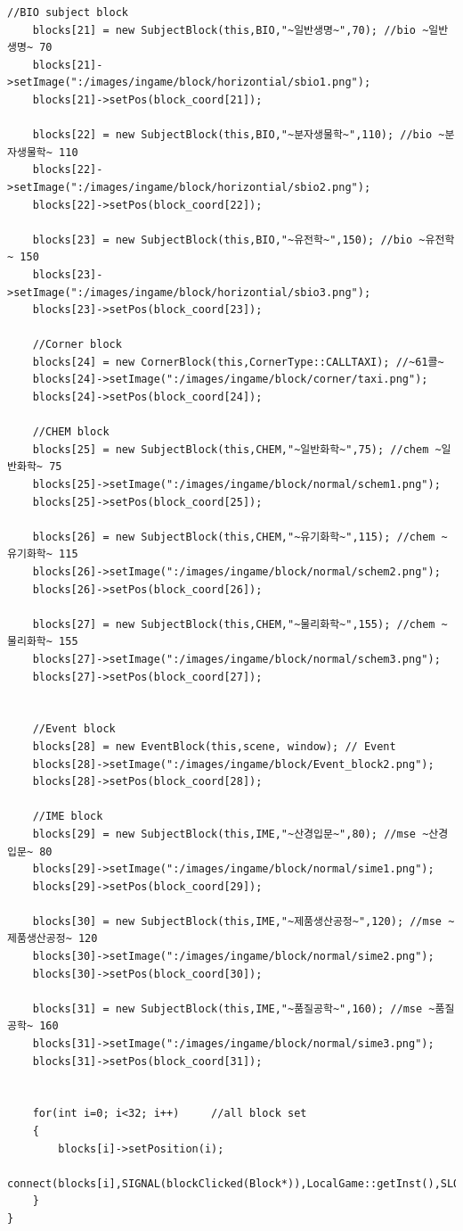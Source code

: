 \documentclass[10pt,oneside,a4paper,titlepage]{article}
\begin{document}
\begin{lstlisting}[escapeinside=~~]
    //BIO subject block
    blocks[21] = new SubjectBlock(this,BIO,"~일반생명~",70); //bio ~일반생명~ 70
    blocks[21]->setImage(":/images/ingame/block/horizontial/sbio1.png");
    blocks[21]->setPos(block_coord[21]);

    blocks[22] = new SubjectBlock(this,BIO,"~분자생물학~",110); //bio ~분자생물학~ 110
    blocks[22]->setImage(":/images/ingame/block/horizontial/sbio2.png");
    blocks[22]->setPos(block_coord[22]);

    blocks[23] = new SubjectBlock(this,BIO,"~유전학~",150); //bio ~유전학~ 150
    blocks[23]->setImage(":/images/ingame/block/horizontial/sbio3.png");
    blocks[23]->setPos(block_coord[23]);

    //Corner block
    blocks[24] = new CornerBlock(this,CornerType::CALLTAXI); //~61콜~
    blocks[24]->setImage(":/images/ingame/block/corner/taxi.png");
    blocks[24]->setPos(block_coord[24]);

    //CHEM block
    blocks[25] = new SubjectBlock(this,CHEM,"~일반화학~",75); //chem ~일반화학~ 75
    blocks[25]->setImage(":/images/ingame/block/normal/schem1.png");
    blocks[25]->setPos(block_coord[25]);

    blocks[26] = new SubjectBlock(this,CHEM,"~유기화학~",115); //chem ~유기화학~ 115
    blocks[26]->setImage(":/images/ingame/block/normal/schem2.png");
    blocks[26]->setPos(block_coord[26]);

    blocks[27] = new SubjectBlock(this,CHEM,"~물리화학~",155); //chem ~물리화학~ 155
    blocks[27]->setImage(":/images/ingame/block/normal/schem3.png");
    blocks[27]->setPos(block_coord[27]);

    
    //Event block
    blocks[28] = new EventBlock(this,scene, window); // Event
    blocks[28]->setImage(":/images/ingame/block/Event_block2.png");
    blocks[28]->setPos(block_coord[28]);

    //IME block
    blocks[29] = new SubjectBlock(this,IME,"~산경입문~",80); //mse ~산경입문~ 80
    blocks[29]->setImage(":/images/ingame/block/normal/sime1.png");
    blocks[29]->setPos(block_coord[29]);

    blocks[30] = new SubjectBlock(this,IME,"~제품생산공정~",120); //mse ~제품생산공정~ 120
    blocks[30]->setImage(":/images/ingame/block/normal/sime2.png");
    blocks[30]->setPos(block_coord[30]);

    blocks[31] = new SubjectBlock(this,IME,"~품질공학~",160); //mse ~품질공학~ 160
    blocks[31]->setImage(":/images/ingame/block/normal/sime3.png");
    blocks[31]->setPos(block_coord[31]);


    for(int i=0; i<32; i++)     //all block set
    {
        blocks[i]->setPosition(i);
        connect(blocks[i],SIGNAL(blockClicked(Block*)),LocalGame::getInst(),SLOT(blockEvent(Block*)));
    }
}

\end{lstlisting}
\end{document}
